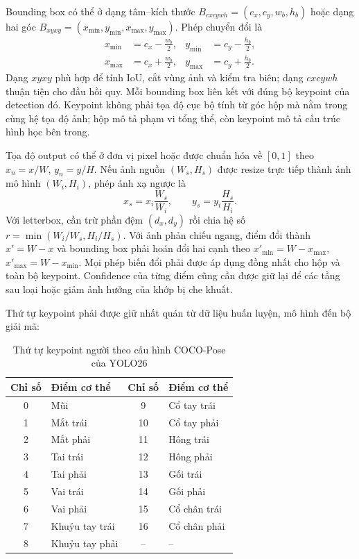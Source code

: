 Bounding box có thể ở dạng tâm--kích thước $B_{cxcywh}=(c_x,c_y,w_b,h_b)$ hoặc dạng hai góc $B_{xyxy}=(x_{\min},y_{\min},x_{\max},y_{\max})$. Phép chuyển đổi là
\begin{equation}
\begin{aligned}
x_{\min}&=c_x-\frac{w_b}{2}, & y_{\min}&=c_y-\frac{h_b}{2},\\
x_{\max}&=c_x+\frac{w_b}{2}, & y_{\max}&=c_y+\frac{h_b}{2}.
\end{aligned}
\end{equation}
Dạng $xyxy$ phù hợp để tính IoU, cắt vùng ảnh và kiểm tra biên; dạng $cxcywh$ thuận tiện cho đầu hồi quy. Mỗi bounding box liên kết với đúng bộ keypoint của detection đó. Keypoint không phải tọa độ cục bộ tính từ góc hộp mà nằm trong cùng hệ tọa độ ảnh; hộp mô tả phạm vi tổng thể, còn keypoint mô tả cấu trúc hình học bên trong.

Tọa độ output có thể ở đơn vị pixel hoặc được chuẩn hóa về $[0,1]$ theo $x_n=x/W$, $y_n=y/H$. Nếu ảnh nguồn $(W_s,H_s)$ được resize trực tiếp thành ảnh mô hình $(W_i,H_i)$, phép ánh xạ ngược là
\begin{equation}
x_s=x_i\frac{W_s}{W_i},\qquad y_s=y_i\frac{H_s}{H_i}.
\end{equation}
Với letterbox, cần trừ phần đệm $(d_x,d_y)$ rồi chia hệ số $r=\min(W_i/W_s,H_i/H_s)$. Với ảnh phản chiếu ngang, điểm đổi thành $x'=W-x$ và bounding box phải hoán đổi hai cạnh theo $x'_{\min}=W-x_{\max}$, $x'_{\max}=W-x_{\min}$. Mọi phép biến đổi phải được áp dụng đồng nhất cho hộp và toàn bộ keypoint. Confidence của từng điểm cũng cần được giữ lại để các tầng sau loại hoặc giảm ảnh hưởng của khớp bị che khuất.

Thứ tự keypoint phải được giữ nhất quán từ dữ liệu huấn luyện, mô hình đến bộ giải mã:

\begin{table}[H]
\centering
\caption{Thứ tự keypoint người theo cấu hình COCO-Pose của YOLO26}
\label{tab:yolo26_keypoint_order}
\renewcommand{\arraystretch}{1.08}
\begin{tabular}{|c|l|c|l|}
\hline
\textbf{Chỉ số} & \textbf{Điểm cơ thể} & \textbf{Chỉ số} & \textbf{Điểm cơ thể} \\
\hline
0 & Mũi & 9 & Cổ tay trái \\
1 & Mắt trái & 10 & Cổ tay phải \\
2 & Mắt phải & 11 & Hông trái \\
3 & Tai trái & 12 & Hông phải \\
4 & Tai phải & 13 & Gối trái \\
5 & Vai trái & 14 & Gối phải \\
6 & Vai phải & 15 & Cổ chân trái \\
7 & Khuỷu tay trái & 16 & Cổ chân phải \\
8 & Khuỷu tay phải & -- & -- \\
\hline
\end{tabular}
\end{table}

